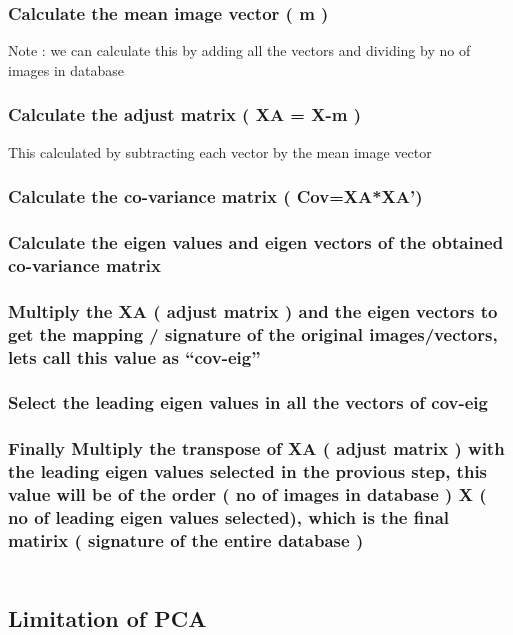 \documentclass[10pt,a4paper]{article}
\begin{document}
\subsubsection{Calculate the mean image vector  ( m )  } 

 Note : we can calculate this by adding all the vectors and dividing by  no of images in database

\subsubsection{Calculate the adjust matrix  ( XA = X-m ) }

    This calculated by subtracting each vector by the mean image vector

\subsubsection{ Calculate the co-variance matrix ( Cov=XA*XA’) }

\subsubsection{ Calculate the eigen values and eigen vectors of the obtained co-variance matrix }

\subsubsection{ Multiply the XA ( adjust matrix ) and the eigen vectors to get the mapping / signature of the original images/vectors, lets call this value as “cov-eig” }

\subsubsection{ Select the leading eigen values in all the vectors of cov-eig }

\subsubsection{ Finally Multiply the transpose of XA ( adjust matrix ) with the leading eigen values selected in the provious step, this value will be of the order ( no of images in database ) X ( no of leading eigen values selected), which is the final matirix ( signature of the entire database ) \\ \\}

\subsection{Limitation of PCA \\ \\} 
\end{document}
